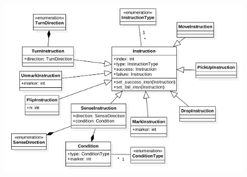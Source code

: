 \documentclass[11pt]{article}
\begin{document}
\begin{center}
\includegraphics[width=0.8\textwidth]{low-level-diagrams/class/instruction.png}
\end{center}
\end{document}
